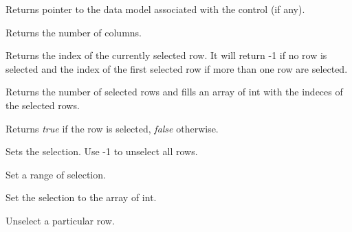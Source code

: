 \label{wxdataviewctrlgetmodel}


Returns pointer to the data model associated with the
control (if any).

\label{wxdataviewctrlgetnumberofcolumns}


Returns the number of columns.

\label{wxdataviewctrlgetselection}


Returns the index of the currently selected row. It will 
return -1 if no row is selected and the index of the first
selected row if more than one row are selected.

\label{wxdataviewctrlgetselections}


Returns the number of selected rows and fills an array of int
with the indeces of the selected rows.

\label{wxdataviewctrlisselected}


Returns {\it true} if the row is selected, {\it false} otherwise.

\label{wxdataviewctrlsetselection}


Sets the selection. Use -1 to unselect all rows.

\label{wxdataviewctrlsetselectionrange}


Set a range of selection.

\label{wxdataviewctrlsetselections}


Set the selection to the array of int.

\label{wxdataviewctrlunselect}


Unselect a particular row.

